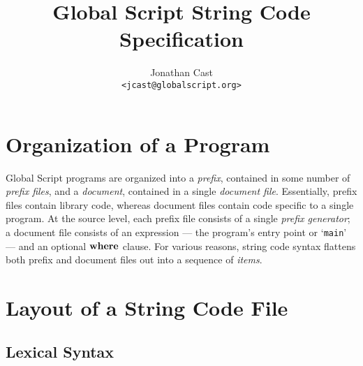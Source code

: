 \documentclass{article}
\title{Global Script String Code Specification}
\author{Jonathan Cast\\\texttt{<jcast@globalscript.org>}}
\newcommand\ccode[1]{\texttt{#1}}
\begin{document}
\maketitle

\section{Organization of a Program}

Global Script programs are organized into a \emph{prefix},
contained in some number of \emph{prefix files},
 and a \emph{document}, contained in a single \emph{document file}.
Essentially, prefix files contain library code, whereas document files contain code specific to a single program.
At the source level, each prefix file consists of a single \emph{prefix generator};
a document file consists of an expression
--- the program's entry point or `\ccode{main}' ---
and an optional $\mathbf{where}$ clause.
For various reasons, string code syntax flattens both prefix and document files out into a sequence of \emph{items}.

\section{Layout of a String Code File}

\subsection{Lexical Syntax}
\end{document}
